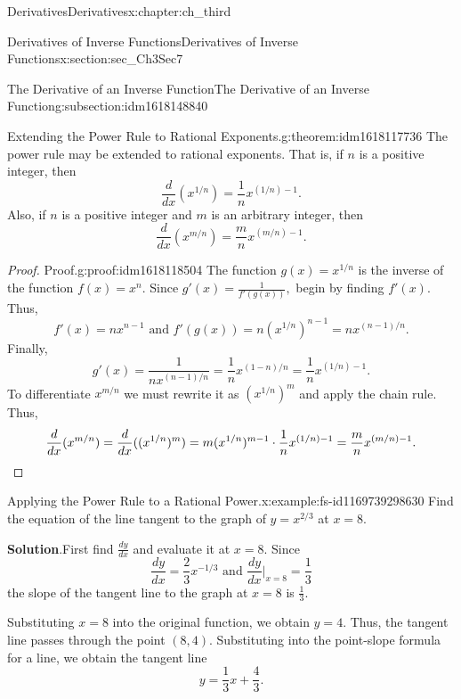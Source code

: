 \documentclass[oneside,10pt,]{book}
\newcommand{\blocktitlefont}{\relax}
\numberwithin{equation}{section}
\newcommand{\qedhere}{\relax}
\begin{document}
\begin{chapterptx}{Derivatives}{}{Derivatives}{}{}{x:chapter:ch_third}
\begin{sectionptx}{Derivatives of Inverse Functions}{}{Derivatives of Inverse Functions}{}{}{x:section:sec_Ch3Sec7}
\begin{subsectionptx}{The Derivative of an Inverse Function}{}{The Derivative of an Inverse Function}{}{}{g:subsection:idm1618148840}
\begin{theorem}{Extending the Power Rule to Rational Exponents.}{}{g:theorem:idm1618117736}
The power rule may be extended to rational exponents. That is, if \(n\) is a positive integer, then%
%
\begin{equation*}
\frac{d}{dx}(x^{1/n})=\frac{1}{n}x^{(1/n)-1}.
\end{equation*}
Also, if \(n\) is a positive integer and \(m\) is an arbitrary integer, then%
%
\begin{equation*}
\frac{d}{dx}(x^{m/n})=\frac{m}{n}x^{(m/n)-1}.
\end{equation*}
\end{theorem}
\begin{proof}{Proof.}{g:proof:idm1618118504}
The function \(g(x)=x^{1/n}\) is the inverse of the function \(f(x)=x^n.\) Since \(g'(x)=\frac{1}{f'(g(x))},\) begin by finding \(f'(x).\) Thus,%
%
\begin{equation*}
f'(x)=nx^{n-1} \text{ and } f'(g(x))=n(x^{1/n})^{n-1}=nx^{(n-1)/n}.
\end{equation*}
Finally,%
%
\begin{equation*}
g'(x)=\frac{1}{nx^{(n-1)/n}}=\frac{1}{n}x^{(1-n)/n}=\frac{1}{n}x^{(1/n)-1}.
\end{equation*}
To differentiate \(x^{m/n}\) we must rewrite it as \((x^{1/n})^m\) and apply the chain rule. Thus,%
%
\begin{equation*}
\frac{d}{dx}(x^{m/n})=\frac{d}{dx}((x^{1/n})^m)=m(x^{1/n})^{m-1}\cdot \frac{1}{n}x^{(1/n)-1}=\frac{m}{n}x^{(m/n)-1}.\qedhere
\end{equation*}
\end{proof}
\begin{example}{Applying the Power Rule to a Rational Power.}{x:example:fs-id1169739298630}%
Find the equation of the line tangent to the graph of \(y=x^{2/3}\) at \(x=8.\)%
\par\smallskip%
\noindent\textbf{\blocktitlefont Solution}.\hypertarget{g:solution:idm1618109288}{}\quad{}First find \(\frac{dy}{dx}\) and evaluate it at \(x=8.\) Since%
%
\begin{equation*}
\frac{dy}{dx}=\frac{2}{3}x^{-1/3} \text{ and } \frac{dy}{dx}|_{x=8}=\frac{1}{3}
\end{equation*}
the slope of the tangent line to the graph at \(x=8\) is \(\frac{1}{3}.\)%
\par
Substituting \(x=8\) into the original function, we obtain \(y=4.\) Thus, the tangent line passes through the point \((8,4).\) Substituting into the point-slope formula for a line, we obtain the tangent line%
%
\begin{equation*}
y=\frac{1}{3}x+\frac{4}{3}.

\end{equation*}
\end{example}
\end{subsectionptx}
\end{sectionptx}
\end{chapterptx}
\end{document}
